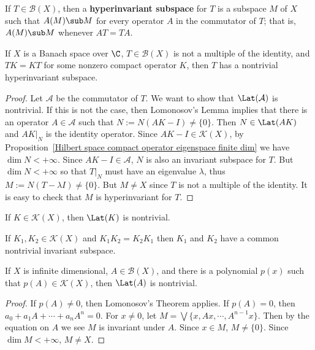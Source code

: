 \begin{definition}
If $T\in\mathcal{B}(X)$, then a \textbf{hyperinvariant subspace} for $T$ is a subspace $M$ of $X$ such that $A(M)\sub M$ for every operator $A$ in the commutator of $T$; that is, $A(M)\sub M$ whenever $AT=TA$.
\end{definition}
\begin{theorem}
If $X$ is a Banach space over $\C$, $T\in\mathcal{B}(X)$ is not a multiple of the identity, and $TK=KT$ for some nonzero compact operator $K$, then $T$ has a nontrivial hyperinvariant subspace.
\end{theorem}
\begin{proof}
Let $\mathcal{A}$ be the commutator of $T$. We want to show that $\Lat(\mathcal{A})$ is nontrivial. If this is not the case, then Lomonosov's Lemma implies that there is an operator $A\in\mathcal{A}$ such that $N:=N(AK-I)\neq\{0\}$. Then $N\in\Lat(AK)$ and $AK|_N$ is the identity operator. Since $AK-I\in\mathcal{K}(X)$, by Proposition~\ref{Hilbert space compact operator eigenspace finite dim} we have $\dim N<+\infty$. Since $AK-I\in\mathcal{A}$, $N$ is also an invariant subspace for $T$. But $\dim N<+\infty$ so that $T|_N$ must have an eigenvalue $\lambda$, thus $M:=N(T-\lambda I)\neq\{0\}$. But $M\neq X$ since $T$ is not a multiple of the identity. It is easy to check that $M$ is hyperinvariant for $T$.
\end{proof}
\begin{corollary}
If $K\in\mathcal{K}(X)$, then $\Lat(K)$ is nontrivial.
\end{corollary}
\begin{corollary}
If $K_1,K_2\in\mathcal{K}(X)$ and $K_1K_2=K_2K_1$ then $K_1$ and $K_2$ have a common nontrivial invariant subspace.
\end{corollary}
\begin{corollary}
If $X$ is infinite dimensional, $A\in\mathcal{B}(X)$, and there is a polynomial $p(x)$ such that $p(A)\in\mathcal{K}(X)$, then $\Lat(A)$ is nontrivial.
\end{corollary}
\begin{proof}
If $p(A)\neq 0$, then Lomonosov's Theorem applies. If $p(A)=0$, then $a_0+a_1A+\cdots+a_nA^n=0$. For $x\neq 0$, let $M=\bigvee\{x,Ax,\cdots,A^{n-1}x\}$. Then by the equation on $A$ we see $M$ is invariant under $A$. Since $x\in M$, $M\neq\{0\}$. Since $\dim M<+\infty$, $M\neq X$.
\end{proof}
